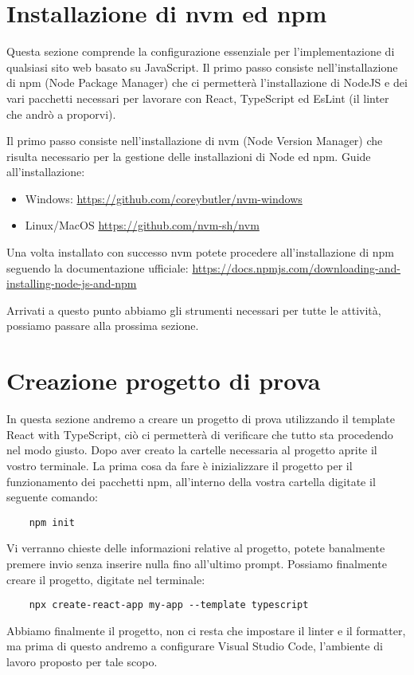 \section{Installazione di nvm ed npm}
Questa sezione comprende la configurazione essenziale per l'implementazione di
qualsiasi sito web basato su JavaScript. Il primo passo consiste nell'installazione
di npm (Node Package Manager) che ci permetterà l'installazione di NodeJS e dei vari pacchetti necessari per lavorare con React, TypeScript ed EsLint (il linter che andrò a proporvi).

Il primo passo consiste nell'installazione di nvm (Node Version Manager) che risulta necessario per la gestione delle installazioni di Node ed npm. Guide
all'installazione:
\begin{itemize}
    \item Windows: \url{https://github.com/coreybutler/nvm-windows}
    \item Linux/MacOS \url{https://github.com/nvm-sh/nvm}
\end{itemize}

Una volta installato con successo nvm potete procedere all'installazione di npm seguendo la documentazione ufficiale: \url{https://docs.npmjs.com/downloading-and-installing-node-js-and-npm}

\bigskip

Arrivati a questo punto abbiamo gli strumenti necessari per tutte le attività, possiamo passare alla prossima sezione.

\section{Creazione progetto di prova}
In questa sezione andremo a creare un progetto di prova utilizzando il template React with TypeScript, ciò ci permetterà di verificare che tutto sta procedendo nel modo giusto. Dopo aver creato la cartelle necessaria al progetto aprite il vostro terminale. La prima cosa da fare è inizializzare il progetto per il funzionamento dei pacchetti npm, all'interno della vostra cartella digitate il seguente comando:
\begin{verbatim}
    npm init
\end{verbatim}
Vi verranno chieste delle informazioni relative al progetto, potete banalmente premere invio senza inserire nulla fino all'ultimo prompt.
Possiamo finalmente creare il progetto, digitate nel terminale:
\begin{verbatim}
    npx create-react-app my-app --template typescript
\end{verbatim}
Abbiamo finalmente il progetto, non ci resta che impostare il linter e il formatter, ma prima di questo andremo a configurare Visual Studio Code, l'ambiente di lavoro proposto per tale scopo.


